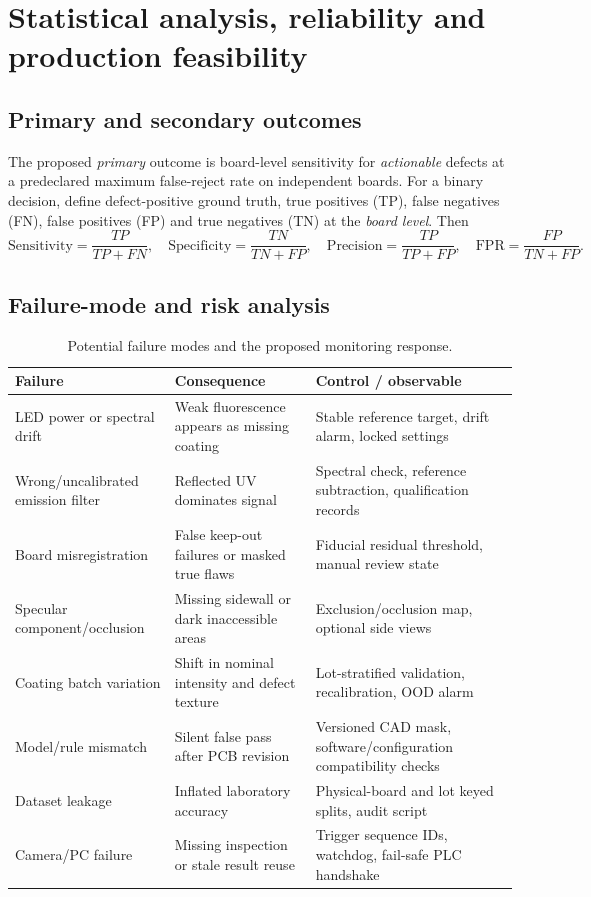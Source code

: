 \section{Statistical analysis, reliability and production feasibility}
\subsection{Primary and secondary outcomes}
The proposed \emph{primary} outcome is board-level sensitivity for \emph{actionable} defects at a predeclared maximum false-reject rate on independent boards. For a binary decision, define defect-positive ground truth, true positives (TP), false negatives (FN), false positives (FP) and true negatives (TN) at the \emph{board level}. Then
\begin{equation}
\mathrm{Sensitivity}=\frac{TP}{TP+FN},\quad \mathrm{Specificity}=\frac{TN}{TN+FP},\quad
\mathrm{Precision}=\frac{TP}{TP+FP},\quad \mathrm{FPR}=\frac{FP}{TN+FP}.
\end{equation}
\subsection{Failure-mode and risk analysis}
\begin{table}[htbp]\centering\footnotesize
\caption{Potential failure modes and the proposed monitoring response.}\label{tab:risk}
\begin{tabularx}{\textwidth}{p{28mm}X p{35mm}}\toprule
Failure & Consequence & Control / observable \\\midrule
LED power or spectral drift & Weak fluorescence appears as missing coating & Stable reference target, drift alarm, locked settings\\
Wrong/uncalibrated emission filter & Reflected UV dominates signal & Spectral check, reference subtraction, qualification records\\
Board misregistration & False keep-out failures or masked true flaws & Fiducial residual threshold, manual review state\\
Specular component/occlusion & Missing sidewall or dark inaccessible areas & Exclusion/occlusion map, optional side views\\
Coating batch variation & Shift in nominal intensity and defect texture & Lot-stratified validation, recalibration, OOD alarm\\
Model/rule mismatch & Silent false pass after PCB revision & Versioned CAD mask, software/configuration compatibility checks\\
Dataset leakage & Inflated laboratory accuracy & Physical-board and lot keyed splits, audit script\\
Camera/PC failure & Missing inspection or stale result reuse & Trigger sequence IDs, watchdog, fail-safe PLC handshake\\
\bottomrule\end{tabularx}
\end{table}

